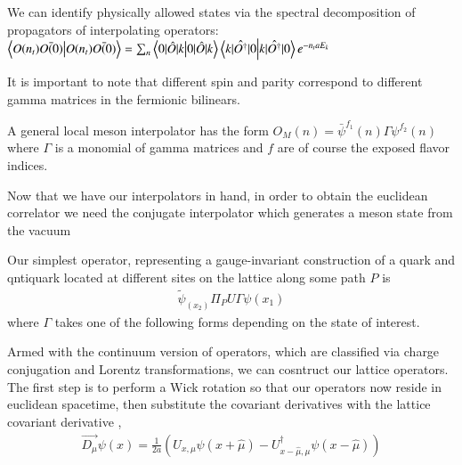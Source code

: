 We can identify physically allowed states via the spectral decomposition of propagators of interpolating operators: 
$\braket{O(n_t)\bar{O(0)}} = \sum_{n}\braket{0|\hat{O}|k} \braket{k|\hat{O^{\dagger}}|0} e^{-n_taE_k}$

It is important to note that different spin and parity correspond to different gamma matrices in the fermionic bilinears. 

A general local meson interpolator has the form $O_M(n) = \bar{\psi}^{f_1}(n)\Gamma\psi^{f_2}(n)$ where $\Gamma$ is a monomial of gamma matrices and $f$ are of course the exposed flavor indices. 

Now that we have our interpolators in hand, in order to obtain the euclidean correlator we need the conjugate interpolator which generates a meson state from the vacuum 

Our simplest operator, representing a gauge-invariant construction of a quark and qntiquark located at different sites on the lattice along some path $P$ is 
\begin{align}
    \tilde{\psi}_(x_2)\Pi_P U \Gamma \psi(x_1)
\end{align}
where $\Gamma$ takes one of the following forms depending on the state of interest. 

Armed with the continuum version of operators, which are classified via charge conjugation and Lorentz transformations, we can cosntruct our lattice operators. The first step is to perform a Wick rotation so that our operators now reside in euclidean spacetime, then substitute the covariant derivatives with the lattice covariant derivative \cite{G_ckeler_1996}, 
\begin{align}
    \overrightarrow{D_\mu}\psi(x) = \frac{1}{2a}(U_{x,\mu}\psi(x + \hat{\mu}) - U_{x-\hat{\mu},\mu}^\dagger\psi(x - \hat{\mu}))
\end{align}

